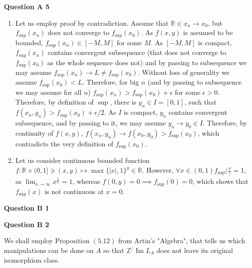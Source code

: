 \documentclass[8pt]{article} %
\renewcommand\Im{\operatorname{Im}}
\newcommand{\myabs}[1]{\left|#1\right|}
\newcommand{\questionA}[1]{\noindent\textbf{Question A #1}\par}
\newcommand{\questionB}[1]{\noindent\textbf{Question B #1}\par}
\let\oldlim\lim
\renewcommand{\lim}{\displaystyle\oldlim}
\let\oldmax\max
\renewcommand{\max}{\displaystyle\oldmax}
\begin{document}
\questionA{5}
\begin{enumerate}[label=(\arabic*)]
\item{Let us employ proof by contradiction. Assume that $\mathbb{R}\in x_n\to x_0$, but $f_{\sup}(x_n)$ does not converge to $f_{\sup}(x_0)$.
As $f(x,y)$ is assumed to be bounded, $f_{\sup}(x_n)\in[-M,M]$ for some $M$. As $[-M,M]$ is compact, $f_{\sup}(x_n)$ contains convergent
subsequence (that does not converge to $f_{\sup}(x_0)$ as the whole sequence does not) and by passing to subsequence we may assume
$f_{\sup}(x_n)\to L\neq f_{\sup}(x_0)$.
 Without loss of generality we assume $f_{\sup}(x_0)<L$. Therefore, for big $n$ (and by passing to subsequence we may assume
for all $n$) $f_{\sup}(x_n)>f_{\sup}(x_0)+\epsilon$ for some $\epsilon>0$. Therefore, by definition of $\sup$, there is $y_n\in I=[0,1]$,
such that $f(x_n,y_n)>f_{\sup}(x_0)+\epsilon/2$. As $I$ is compact, $y_n$ contains convergent subsequence, and by passing to it, we may assume
$y_n\to y_0\in I$. Therefore, by continuity of $f(x,y)$, $f(x_n,y_n)\to f(x_0,y_0)>f_{\sup}(x_0)$, which contradicts the very definition of
$f_{\sup}(x_0)$.
}
\item{
Let us consider continuous bounded function $f:\mathbb{R}\times (0,1]\ni(x,y)\mapsto \max\{\myabs{x},1\}^y\in\mathbb{R}$. However, 
$\forall x\in(0,1)f_{\sup}(\frac{x})=1$, as $\lim_{n\to\infty}x^{\frac{1}{n}}=1$, whereas $f(0,y)=0\implies f_{\sup}(0)=0$, which shows
that $f_{\sup}(x)$ is not continuous at $x=0$.
}
\end{enumerate}
\questionB{1}
\questionB{2}
	We shall employ Proposition $(5.12)$ from Artin's "Algebra", that tells us which manipulations can be done on $A$ so that $\mathbb{Z}^/
	\Im L_A$ does not leave its original isomorphism class.
\end{document}
